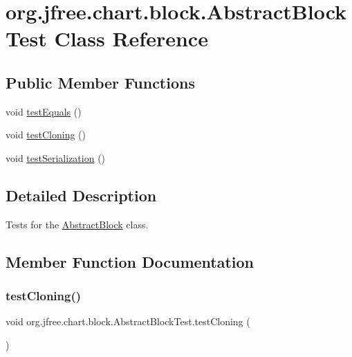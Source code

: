 \hypertarget{classorg_1_1jfree_1_1chart_1_1block_1_1_abstract_block_test}{}\section{org.\+jfree.\+chart.\+block.\+Abstract\+Block\+Test Class Reference}
\label{classorg_1_1jfree_1_1chart_1_1block_1_1_abstract_block_test}
\subsection*{Public Member Functions}
\begin{DoxyCompactItemize}
\item 
void \mbox{\hyperlink{classorg_1_1jfree_1_1chart_1_1block_1_1_abstract_block_test_a5be20177d48730248d4a346158c84f9c}{test\+Equals}} ()
\item 
void \mbox{\hyperlink{classorg_1_1jfree_1_1chart_1_1block_1_1_abstract_block_test_af2e24a747e56e1c5fb00e12e5bc47655}{test\+Cloning}} ()
\item 
void \mbox{\hyperlink{classorg_1_1jfree_1_1chart_1_1block_1_1_abstract_block_test_abcc0ab6ecedda41450c589b738e7a242}{test\+Serialization}} ()
\end{DoxyCompactItemize}


\subsection{Detailed Description}
Tests for the \mbox{\hyperlink{classorg_1_1jfree_1_1chart_1_1block_1_1_abstract_block}{Abstract\+Block}} class. 

\subsection{Member Function Documentation}
\mbox{\label{classorg_1_1jfree_1_1chart_1_1block_1_1_abstract_block_test_af2e24a747e56e1c5fb00e12e5bc47655}} 
\subsubsection{\texorpdfstring{test\+Cloning()}{testCloning()}}
{\footnotesize\ttfamily void org.\+jfree.\+chart.\+block.\+Abstract\+Block\+Test.\+test\+Cloning (\begin{DoxyParamCaption}{ }\end{DoxyParamCaption})}

